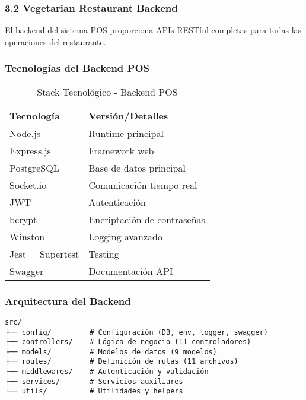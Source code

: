\documentclass[12pt,a4paper]{article}
\begin{document}
\subsubsection{3.2 Vegetarian Restaurant Backend}

El backend del sistema POS proporciona APIs RESTful completas para todas las operaciones del restaurante.

\subsubsection{Tecnologías del Backend POS}
\begin{table}[H]
\centering
\begin{tabular}{@{}ll@{}}
\toprule
\textbf{Tecnología} & \textbf{Versión/Detalles} \\
\midrule
Node.js & Runtime principal \\
Express.js & Framework web \\
PostgreSQL & Base de datos principal \\
Socket.io & Comunicación tiempo real \\
JWT & Autenticación \\
bcrypt & Encriptación de contraseñas \\
Winston & Logging avanzado \\
Jest + Supertest & Testing \\
Swagger & Documentación API \\
\bottomrule
\end{tabular}
\caption{Stack Tecnológico - Backend POS}
\end{table}

\subsubsection{Arquitectura del Backend}
\begin{verbatim}
src/
├── config/         # Configuración (DB, env, logger, swagger)
├── controllers/    # Lógica de negocio (11 controladores)
├── models/         # Modelos de datos (9 modelos)
├── routes/         # Definición de rutas (11 archivos)
├── middlewares/    # Autenticación y validación
├── services/       # Servicios auxiliares
└── utils/          # Utilidades y helpers
\end{verbatim}
\end{document}
